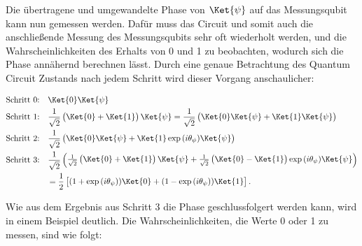 Die übertragene und umgewandelte Phase von \(\Ket{\psi}\) auf das Messungsqubit kann nun gemessen werden. Dafür muss das Circuit und somit auch die anschließende Messung des Messungsqubits sehr oft wiederholt werden, und die Wahrscheinlichkeiten des Erhalts von 0 und 1 zu beobachten, wodurch sich die Phase annähernd berechnen lässt.
Durch eine genaue Betrachtung des Quantum Circuit Zustands nach jedem Schritt wird dieser Vorgang anschaulicher: \newline


\begin{align*}
     & \text{Schritt 0:}\quad \Ket{0}\Ket{\psi}                                                                                                                                                                                            \\
     & \text{Schritt 1:}\quad \frac{1}{\sqrt{2}}\begin{pmatrix}\Ket{0} + \Ket{1}\end{pmatrix}\Ket{\psi} =  \frac{1}{\sqrt{2}}\begin{pmatrix}\Ket{0}\Ket{\psi} + \Ket{1}\Ket{\psi}\end{pmatrix}                                             \\
     & \text{Schritt 2:}\quad \frac{1}{\sqrt{2}} \begin{pmatrix}\Ket{0}\Ket{\psi} + \Ket{1}\exp{(i\theta_\psi)}\Ket{\psi}\end{pmatrix}                                                                                                     \\
     & \text{Schritt 3:}\quad \frac{1}{\sqrt{2}} \begin{pmatrix}\frac{1}{\sqrt{2}}\begin{pmatrix}\Ket{0} + \Ket{1} \end{pmatrix}\Ket{\psi} + \frac{1}{\sqrt{2}}\begin{pmatrix}\Ket{0} - \Ket{1} \end{pmatrix}\exp{(i\theta_\psi)}\Ket{\psi}\end{pmatrix} \\ & \quad\quad\quad\quad\quad = \frac{1}{2} \begin{bmatrix}(1 + \exp{(i\theta_\psi)})\Ket{0} + (1 - \exp{(i\theta_\psi)})\Ket{1}\end{bmatrix}.
\end{align*}

Wie aus dem Ergebnis aus Schritt 3 die Phase geschlussfolgert werden kann, wird in einem Beispiel deutlich. Die Wahrscheinlichkeiten, die Werte 0 oder 1 zu messen, sind wie folgt:

